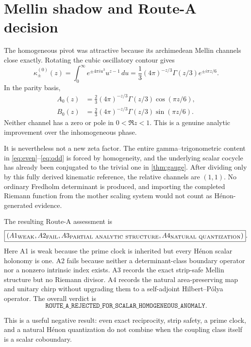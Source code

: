 \section{Mellin shadow and Route-A decision}

The homogeneous pivot was attractive because its archimedean Mellin
channels close exactly.  Rotating the cubic oscillatory contour gives
\begin{equation}\label{eq:kappa}
  \kappa^{(0)}_\pm(z)=
  \int_0^\infty e^{\pm4\pi i u^3}u^{z-1}\,du
  =\frac13(4\pi)^{-z/3}\Gamma(z/3)e^{\pm i\pi z/6}.
\end{equation}
In the parity basis,
\begin{align}
  A_0(z)&=\frac23(4\pi)^{-z/3}\Gamma(z/3)
          \cos(\pi z/6),\label{eq:even}\\
  B_0(z)&=\frac23(4\pi)^{-z/3}\Gamma(z/3)
          \sin(\pi z/6).\label{eq:odd}
\end{align}
Neither channel has a zero or pole in \(0<\Re z<1\).  This is a genuine
analytic improvement over the inhomogeneous phase.

It is nevertheless not a new zeta factor.  The entire gamma--trigonometric
content in \eqref{eq:even}--\eqref{eq:odd} is forced by homogeneity, and the
underlying scalar cocycle has already been conjugated to the trivial one in
\cref{thm:gauge}.  After dividing only by this fully derived kinematic
reference, the relative channels are \((1,1)\).  No ordinary Fredholm
determinant is produced, and importing the completed Riemann function from
the mother scaling system would not count as H\'enon-generated evidence.

The resulting Route-A assessment is
\[
  \boxed{(A1_{\rm WEAK},A2_{\rm FAIL},
  A3_{\rm PARTIAL\ ANALYTIC\ STRUCTURE},
  A4_{\rm NATURAL\ QUANTIZATION})}.
\]
Here A1 is weak because the prime clock is inherited but every H\'enon
scalar holonomy is one.  A2 fails because neither a determinant-class
boundary operator nor a nonzero intrinsic index exists.  A3 records the
exact strip-safe Mellin structure but no Riemann divisor.  A4 records the
natural area-preserving map and unitary chirp without upgrading them to a
self-adjoint Hilbert--P\'olya operator.  The overall verdict is
\[
  \texttt{ROUTE\_A\_REJECTED\_FOR\_SCALAR\_HOMOGENEOUS\_ANOMALY}.
\]

This is a useful negative result: even exact reciprocity, strip safety, a
prime clock, and a natural H\'enon quantization do not combine when the
coupling class itself is a scalar coboundary.

